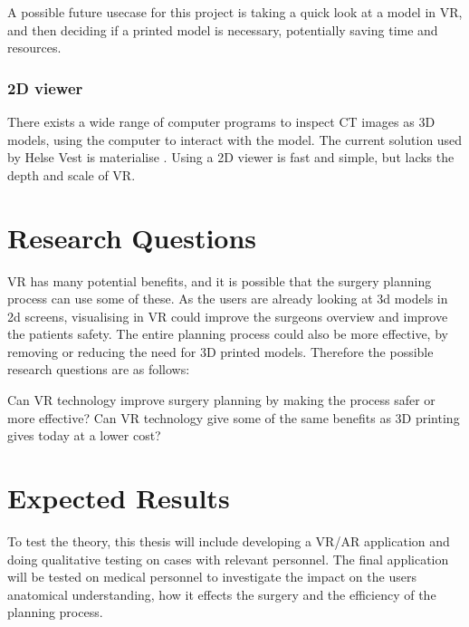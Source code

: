 \documentclass[11pt]{scrartcl}
\begin{document}
A possible future usecase for this project is taking a quick look at a model in VR, and then deciding if a printed model is necessary, potentially saving time and resources.

\subsubsection {2D viewer}

There exists a wide range of computer programs to inspect CT images as 3D models, using the computer to interact with the model.
The current solution used by Helse Vest is materialise \cite{materialise}. Using a 2D viewer is fast and simple, but lacks the depth and scale of VR.


\section{Research Questions}
VR has many potential benefits, and it is possible that the surgery planning
process can use some of these. As the users are already looking at 3d models in
2d screens, visualising in VR could improve the surgeons overview and improve the patients safety. The entire planning process could also be more effective, by removing or reducing the need for 3D printed models. Therefore the possible research questions are as follows:

Can VR technology improve surgery planning by making the process safer or more effective?
Can VR technology give some of the same benefits as 3D printing gives today at a lower cost?


\section{Expected Results}
To test the theory, this thesis will include developing a VR/AR application and
doing qualitative testing on cases with relevant personnel.
The final application will be tested on medical personnel to investigate the impact on the users anatomical understanding, how it effects the surgery and the efficiency of the planning process. 
\end{document}
